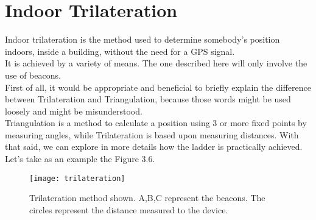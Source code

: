\section{Indoor Trilateration}
Indoor trilateration is the method used to determine somebody's position indoors, inside a building, without the need for a GPS signal.\\
It is achieved by a variety of means. The one described here will only involve the use of beacons.\\
First of all, it would be appropriate and beneficial to briefly explain the difference between Trilateration and Triangulation, because those words might be used loosely and might be misunderstood.\\
Triangulation is a method to calculate a position using 3 or more fixed points by measuring angles, while Trilateration is based upon measuring distances. With that said, we can explore in more details how the ladder is practically achieved.\\
Let's take as an example the Figure 3.6.\\

		\begin{wrapfigure}{l}{0.4\textwidth}
		\centering
		\texttt{[image: trilateration]}
		\caption{Trilateration method shown. A,B,C represent the beacons. The circles represent the distance measured to the device.}
		\label{trilateration}
	\end{wrapfigure}


